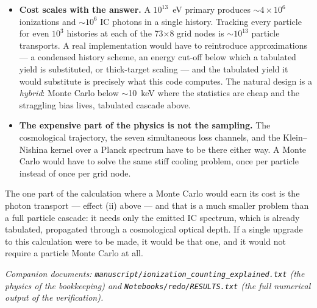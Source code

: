 \documentclass[11pt,a4paper]{article}
\newcommand{\file}[1]{\texttt{\small #1}}
\begin{document}
\begin{itemize}[leftmargin=1.3em]
\item \textbf{Cost scales with the answer.}  A $10^{13}$~eV primary produces
      $\sim4\times10^{6}$ ionizations and $\sim10^{6}$ IC photons in a single
      history.  Tracking every particle for even $10^{3}$ histories at each of
      the 73$\times$8 grid nodes is $\sim10^{13}$ particle transports.  A real
      implementation would have to reintroduce approximations --- a condensed
      history scheme, an energy cut-off below which a tabulated yield is
      substituted, or thick-target scaling --- and the tabulated yield it would
      substitute is precisely what this code computes.  The natural design is a
      \emph{hybrid}: Monte Carlo below $\sim$10~keV where the statistics are
      cheap and the straggling bias lives, tabulated cascade above.
\item \textbf{The expensive part of the physics is not the sampling.}  The
      cosmological trajectory, the seven simultaneous loss channels, and the
      Klein--Nishina kernel over a Planck spectrum have to be there either way.
      A Monte Carlo would have to solve the same stiff cooling problem, once
      per particle instead of once per grid node.
\end{itemize}

\noindent
The one part of the calculation where a Monte Carlo would earn its cost is the
photon transport --- effect (ii) above --- and that is a much smaller problem
than a full particle cascade: it needs only the emitted IC spectrum, which is
already tabulated, propagated through a cosmological optical depth.  If a
single upgrade to this calculation were to be made, it would be that one,
and it would not require a particle Monte Carlo at all.

\vfill
\begin{center}\small\itshape
Companion documents: \file{manuscript/ionization\_counting\_explained.txt}
(the physics of the bookkeeping) and \file{Notebooks/redo/RESULTS.txt}
(the full numerical output of the verification).
\end{center}
\end{document}
